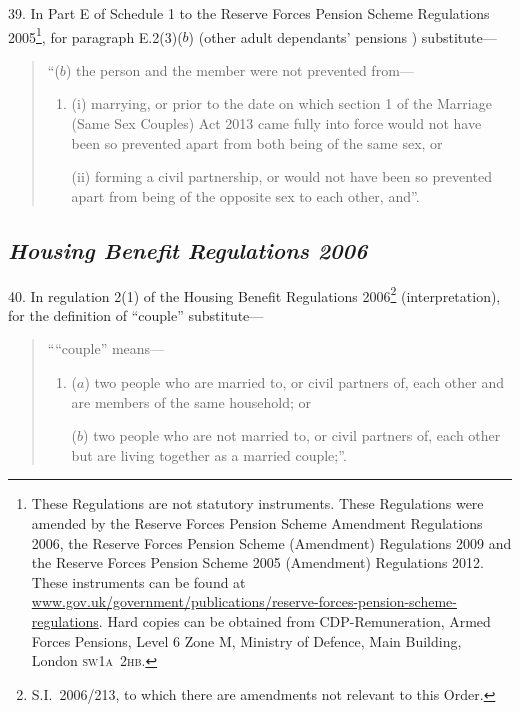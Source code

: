 \documentclass[12pt,a4paper]{article}
\begin{document}
39.  In Part E of Schedule 1 to the Reserve Forces Pension Scheme Regulations 2005\footnote{These Regulations are not statutory instruments. These Regulations were amended by the Reserve Forces Pension Scheme Amendment Regulations 2006, the Reserve Forces Pension Scheme (Amendment) Regulations 2009 and the Reserve Forces Pension Scheme 2005 (Amendment) Regulations 2012. These instruments can be found at \href{http://www.gov.uk/government/publications/reserve-forces-pension-scheme-regulations}{www.\hspace*{0pt}gov.\hspace*{0pt}uk/\hspace*{0pt}government/\hspace*{0pt}publications/\hspace*{0pt}reserve-\hspace*{0pt}forces-\hspace*{0pt}pension-\hspace*{0pt}scheme-\hspace*{0pt}regulations}. Hard copies can be obtained from CDP-Remuneration, Armed Forces Pensions, Level 6 Zone M, Ministry of Defence, Main Building, London \textsc{\lowercase{SW1A~2HB}}.}, for paragraph E.2(3)($b$)  (other adult dependants’ pensions ) substitute—
\begin{quotation}
“($b$) the person and the member were not prevented from—
\begin{enumerate}\item[]
(i) marrying, or prior to the date on which section 1 of the Marriage (Same Sex Couples) Act 2013 came fully into force would not have been so prevented apart from both being of the same sex, or

(ii) forming a civil partnership, or would not have been so prevented apart from being of the opposite sex to each other, and”.
\end{enumerate}
\end{quotation}

\subsection*{\itshape Housing Benefit Regulations 2006}

40.  In regulation 2(1) of the Housing Benefit Regulations 2006\footnote{S.I.~2006/213, to which there are amendments not relevant to this Order.} (interpretation), for the definition of “couple” substitute—
\begin{quotation}
““couple” means—
\begin{enumerate}\item[]
($a$) 
two people who are married to, or civil partners of, each other and are members of the same household; or

($b$) 
two people who are not married to, or civil partners of, each other but are living together as a married couple;”.
\end{enumerate}
\end{quotation}
\end{document}
